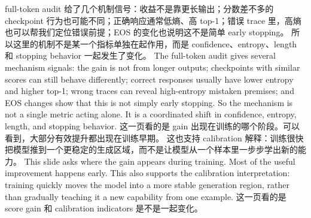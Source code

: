 {}\markdownRendererHorizontalRule{}\markdownRendererInterblockSeparator
{}\markdownRendererInterblockSeparator
{}\markdownRendererInterblockSeparator
{}full-token audit 给了几个机制信号：收益不是靠更长输出；分数差不多的 checkpoint 行为也可能不同；正确响应通常低熵、高 top-1；错误 trace 里，高熵也可以帮我们定位错误前提；EOS 的变化也说明这不是简单 early stopping。\markdownRendererInterblockSeparator
{}所以这里的机制不是某一个指标单独在起作用，而是 confidence、entropy、length 和 stopping behavior 一起发生了变化。\markdownRendererInterblockSeparator
{}\markdownRendererInterblockSeparator
{}The full-token audit gives several mechanism signals: the gain is not from longer outputs; checkpoints with similar scores can still behave differently; correct responses usually have lower entropy and higher top-1; wrong traces can reveal high-entropy mistaken premises; and EOS changes show that this is not simply early stopping.\markdownRendererInterblockSeparator
{}So the mechanism is not a single metric acting alone. It is a coordinated shift in confidence, entropy, length, and stopping behavior.\markdownRendererInterblockSeparator
{}\markdownRendererHorizontalRule{}\markdownRendererInterblockSeparator
{}\markdownRendererInterblockSeparator
{}\markdownRendererInterblockSeparator
{}这一页看的是 gain 出现在训练的哪个阶段。可以看到，大部分有效提升都出现在训练早期。\markdownRendererInterblockSeparator
{}这也支持 calibration 解释：训练很快把模型推到一个更稳定的生成区域，而不是让模型从一个样本里一步步学出新的能力。\markdownRendererInterblockSeparator
{}\markdownRendererInterblockSeparator
{}This slide asks where the gain appears during training. Most of the useful improvement happens early.\markdownRendererInterblockSeparator
{}This also supports the calibration interpretation: training quickly moves the model into a more stable generation region, rather than gradually teaching it a new capability from one example.\markdownRendererInterblockSeparator
{}\markdownRendererHorizontalRule{}\markdownRendererInterblockSeparator
{}\markdownRendererInterblockSeparator
{}\markdownRendererInterblockSeparator
{}这一页看的是 score gain 和 calibration indicators 是不是一起变化。\markdownRendererInterblockSeparator
